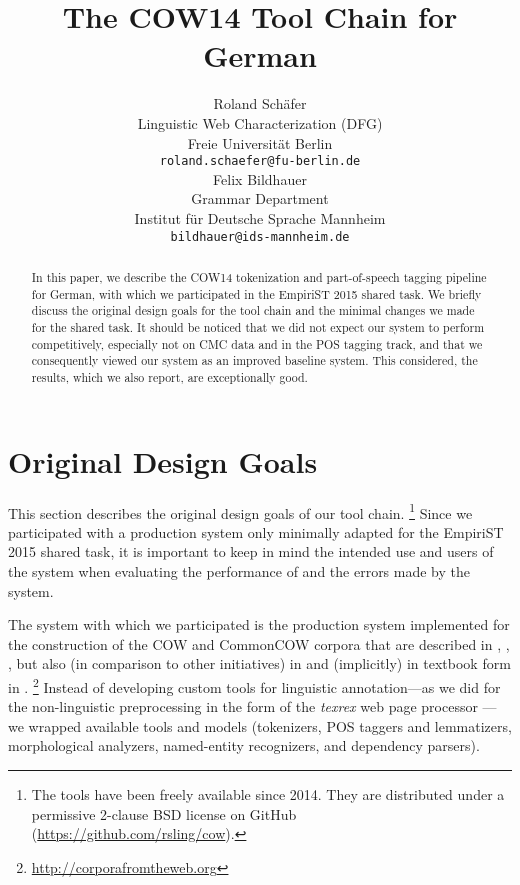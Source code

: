 \documentclass[11pt]{article}
\title{The COW14 Tool Chain for German}
\author{Roland Schäfer \\
  Linguistic Web Characterization (DFG) \\
  Freie Universität Berlin \\
  {\tt roland.schaefer@fu-berlin.de} \\\And
  Felix Bildhauer \\
  Grammar Department \\
  Institut für Deutsche Sprache Mannheim \\
  {\tt bildhauer@ids-mannheim.de} \\}
\date{}
\begin{document}
\maketitle

\begin{abstract}
  In this paper, we describe the COW14 tokenization and part-of-speech tagging pipeline for German, with which we participated in the EmpiriST 2015 shared task.
  We briefly discuss the original design goals for the tool chain and the minimal changes we made for the shared task.
  It should be noticed that we did not expect our system to perform competitively, especially not on CMC data and in the POS tagging track, and that we consequently viewed our system as an improved baseline system.
  This considered, the results, which we also report, are exceptionally good.
\end{abstract}

\section{Original Design Goals}
\label{sec:originaldesigngoals}

This section describes the original design goals of our tool chain.%
\footnote{The tools have been freely available since 2014.
  They are distributed under a permissive 2-clause BSD license on GitHub (\url{https://github.com/rsling/cow}).}
Since we participated with a production system only minimally adapted for the EmpiriST 2015 shared task, it is important to keep in mind the intended use and users of the system when evaluating the performance of and the errors made by the system.

The system with which we participated is the production system implemented for the construction of the COW and CommonCOW corpora that are described in , , , but also (in comparison to other initiatives) in  and (implicitly) in textbook form in .%
\footnote{\url{http://corporafromtheweb.org}}
Instead of developing custom tools for linguistic annotation---as we did for the non-linguistic preprocessing in the form of the \textit{texrex} web page processor \cite{SchaeferBildhauer2012a,Schaefer2015b,Schaefer2016c}---we wrapped available tools and models (tokenizers, POS taggers and lemmatizers, morphological analyzers, named-entity recognizers, and dependency parsers).
\end{document}
